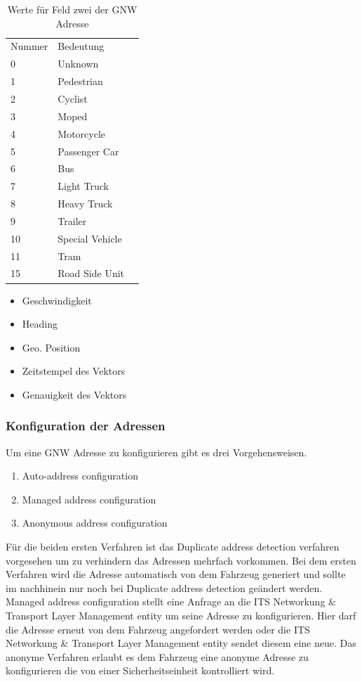 \begin{table}[h]
\caption{Werte für Feld zwei der \acs{GNW} Adresse\cite{etsi302636-4-1}}
\begin{tabular}{lll}
Nummer & Bedeutung  \\
    0 & Unknown \\
    1 & Pedestrian \\
    2 & Cyclist \\
    3 & Moped \\
    4 & Motorcycle \\
    5 & Passenger Car \\
    6 & Bus \\
    7 & Light Truck \\
    8 & Heavy Truck \\
    9 & Trailer \\
    10 & Special Vehicle \\
    11 & Tram \\
    15 & Road Side Unit \\
\end{tabular}
\label{tab:typenspezi}
\end{table}


 \begin{itemize}
      	\item Geschwindigkeit
	\item Heading
	\item Geo. Position
	\item Zeitstempel des Vektors
	\item Genauigkeit des Vektors
      \end{itemize}

\subsubsection{Konfiguration der Adressen}
Um eine \acl{GNW} Adresse zu konfigurieren gibt es drei Vorgehensweisen. 

\begin{enumerate}
      	\item Auto-address configuration
	\item Managed address configuration
	\item Anonymous address configuration
\end{enumerate}
Für die beiden ersten Verfahren ist das Duplicate address detection verfahren vorgesehen um zu verhindern das Adressen mehrfach vorkommen.
Bei dem ersten Verfahren wird die Adresse automatisch von dem Fahrzeug generiert und sollte im nachhinein nur noch bei Duplicate address detection geändert werden. 
Managed address configuration stellt eine Anfrage an die ITS Networkung \& Transport Layer Management entity um seine Adresse zu konfigurieren. Hier darf die Adresse erneut von dem Fahrzeug angefordert werden oder die ITS Networkung \& Transport Layer Management entity sendet diesem eine neue. Das anonyme Verfahren erlaubt es dem Fahrzeug eine anonyme Adresse zu konfigurieren die von einer Sicherheitseinheit kontrolliert wird.


